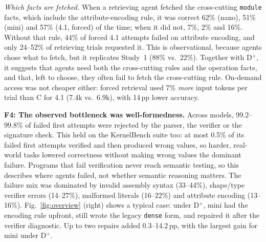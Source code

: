 \documentclass[conference]{IEEEtran}
\newcommand{\pp}{\,pp}
\begin{document}
\emph{Which facts are fetched.} When a retrieving agent fetched the cross-cutting \texttt{module} facts, which include the attribute-encoding rule, it was correct 62\% (nano), 51\% (mini) and 57\% (4.1, forced) of the time; when it did not, 7\%, 2\% and 16\%. Without that rule, 44\% of forced 4.1 attempts failed on attribute encoding, and only 24--52\% of retrieving trials requested it. This is observational, because agents chose what to fetch, but it replicates Study~1 (88\% vs.\ 22\%). Together with D$^+$, it suggests that agents need both the cross-cutting rules and the operation facts, and that, left to choose, they often fail to fetch the cross-cutting rule. On-demand access was not cheaper either: forced retrieval used 7\% \emph{more} input tokens per trial than C for 4.1 (7.4k vs.\ 6.9k), with 14\pp{} lower accuracy.

\textbf{F4: The observed bottleneck was well-formedness.} Across models, 99.2--99.8\% of failed first attempts were rejected by the parser, the verifier or the signature check. This held on the KernelBench suite too: at most 0.5\% of its failed first attempts verified and then produced wrong values, so harder, real-world tasks lowered correctness without making wrong values the dominant failure. Programs that fail verification never reach semantic testing, so this describes where agents failed, not whether semantic reasoning matters. The failure mix was dominated by invalid assembly syntax (33--44\%), shape/type verifier errors (14--27\%), malformed literals (16--22\%) and attribute encoding (13--16\%). Fig.~\ref{fig:overview} (right) shows a typical case: under D$^+$, mini had the encoding rule upfront, still wrote the legacy \texttt{dense} form, and repaired it after the verifier diagnostic. Up to two repairs added 0.3--14.2\pp, with the largest gain for mini under D$^+$.
\end{document}
